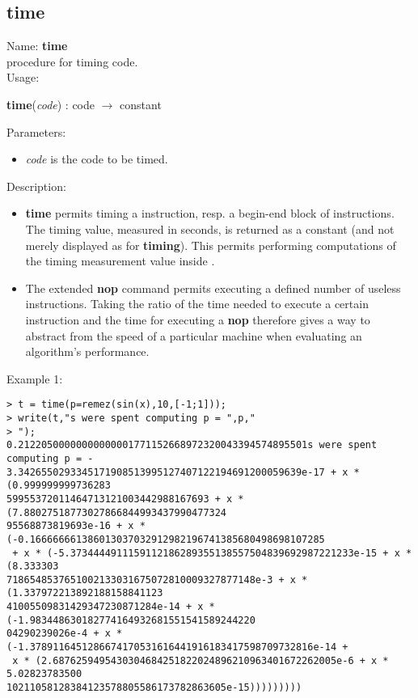 \subsection{time}
\label{labtime}
\noindent Name: \textbf{time}\\
procedure for timing \sollya code.\\
\noindent Usage: 
\begin{center}
\textbf{time}(\emph{code}) : \textsf{code} $\rightarrow$ \textsf{constant}\\
\end{center}
Parameters: 
\begin{itemize}
\item \emph{code} is the code to be timed.
\end{itemize}
\noindent Description: \begin{itemize}

\item \textbf{time} permits timing a \sollya instruction, resp. a begin-end block
   of \sollya instructions. The timing value, measured in seconds, is returned
   as a \sollya constant (and not merely displayed as for \textbf{timing}). This 
   permits performing computations of the timing measurement value inside \sollya.

\item The extended \textbf{nop} command permits executing a defined number of
   useless instructions. Taking the ratio of the time needed to execute a
   certain \sollya instruction and the time for executing a \textbf{nop}
   therefore gives a way to abstract from the speed of a particular 
   machine when evaluating an algorithm's performance.
\end{itemize}
\noindent Example 1: 
\begin{center}\begin{minipage}{15cm}\begin{Verbatim}[frame=single]
> t = time(p=remez(sin(x),10,[-1;1]));
> write(t,"s were spent computing p = ",p,"
> ");
0.21220500000000000001771152668972320043394574895501s were spent computing p = -
3.3426550293345171908513995127407122194691200059639e-17 + x * (0.999999999736283
59955372011464713121003442988167693 + x * (7.88027518773027866844993437990477324
95568873819693e-16 + x * (-0.166666661386013037032912982196741385680498698107285
 + x * (-5.3734444911159112186289355138557504839692987221233e-15 + x * (8.333303
7186548537651002133031675072810009327877148e-3 + x * (1.337972213892188158841123
41005509831429347230871284e-14 + x * (-1.983448630182774164932681551541589244220
04290239026e-4 + x * (-1.3789116451286674170531616441916183417598709732816e-14 +
 x * (2.6876259495430304684251822024896210963401672262005e-6 + x * 5.02823783500
10211058128384123578805586173782863605e-15)))))))))
\end{Verbatim}
\end{minipage}\end{center}
